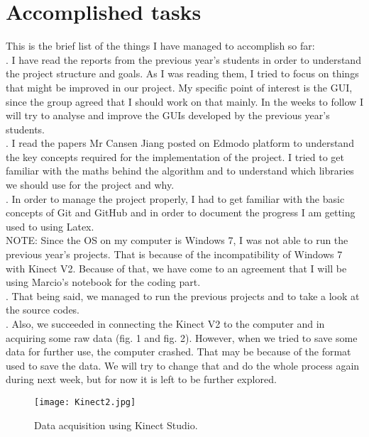 \documentclass[aps,letterpaper,11pt]{revtex4}
\begin{document}
\section {Accomplished tasks}
This is the brief list of the things I have managed to accomplish so far:\\
. I have read the reports from the previous year's students in order to understand the project structure and goals. As I was reading them, I tried to focus on things that might be improved in our project. My specific point of interest is the GUI, since the group agreed that I should work on that mainly. In the weeks to follow I will try to analyse and improve the GUIs developed by the previous year's students.\\ 
. I read the papers Mr Cansen Jiang posted on Edmodo platform to understand the key concepts required for the implementation of the project. I tried to get familiar with the maths behind the algorithm and to understand which libraries we should use for the project and why.\\ 
. In order to manage the project properly, I had to get familiar with the basic concepts of Git and GitHub and in order to document the progress I am getting used to using Latex.\\
\linebreak
NOTE: Since the OS on my computer is Windows 7, I was not able to run the previous year's projects. That is because of the incompatibility of Windows 7 with Kinect V2. Because of that, we have come to an agreement that I will be using Marcio's notebook for the coding part. \\
. That being said, we managed to run the previous projects and to take a look at the source codes.\\
. Also, we succeeded in connecting the Kinect V2 to the computer and in acquiring some raw data (fig. 1 and fig. 2). However, when we tried to save some data for further use, the computer crashed. That may be because of the format used to save the data. We will try to change that and do the whole process again during next week, but for now it is left to be further explored.\\

\begin{figure}[!htb]
  \texttt{[image: Kinect2.jpg]}
  \caption{Data acquisition using Kinect Studio.}
  \label{fig:Kinect2}
\end{figure}
\end{document}
